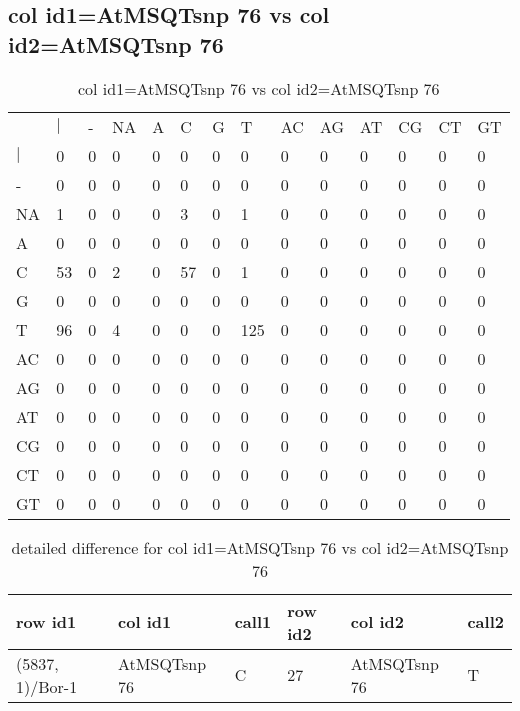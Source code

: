 \subsection{col id1=AtMSQTsnp 76 vs col id2=AtMSQTsnp 76}
\begin{center}
\begin{longtable}{|l|l|l|l|l|l|l|l|l|l|l|l|l|l|}
\caption{col id1=AtMSQTsnp 76 vs col id2=AtMSQTsnp 76} \label{table_dm966}\\
\hline
\\
\hline
&$|$&-&NA&A&C&G&T&AC&AG&AT&CG&CT&GT\\
$|$&0&0&0&0&0&0&0&0&0&0&0&0&0\\
-&0&0&0&0&0&0&0&0&0&0&0&0&0\\
NA&1&0&0&0&3&0&1&0&0&0&0&0&0\\
A&0&0&0&0&0&0&0&0&0&0&0&0&0\\
C&53&0&2&0&57&0&1&0&0&0&0&0&0\\
G&0&0&0&0&0&0&0&0&0&0&0&0&0\\
T&96&0&4&0&0&0&125&0&0&0&0&0&0\\
AC&0&0&0&0&0&0&0&0&0&0&0&0&0\\
AG&0&0&0&0&0&0&0&0&0&0&0&0&0\\
AT&0&0&0&0&0&0&0&0&0&0&0&0&0\\
CG&0&0&0&0&0&0&0&0&0&0&0&0&0\\
CT&0&0&0&0&0&0&0&0&0&0&0&0&0\\
GT&0&0&0&0&0&0&0&0&0&0&0&0&0\\
\hline
\end{longtable}
\end{center}

\begin{center}
\begin{longtable}{|l|l|l|l|l|l|}
\caption{detailed difference for col id1=AtMSQTsnp 76 vs col id2=AtMSQTsnp 76} \label{table_dm967}\\
\hline
row id1&col id1&call1&row id2&col id2&call2\\
\hline
(5837, 1)/Bor-1&AtMSQTsnp 76&C&27&AtMSQTsnp 76&T\\
\hline
\end{longtable}
\end{center}

